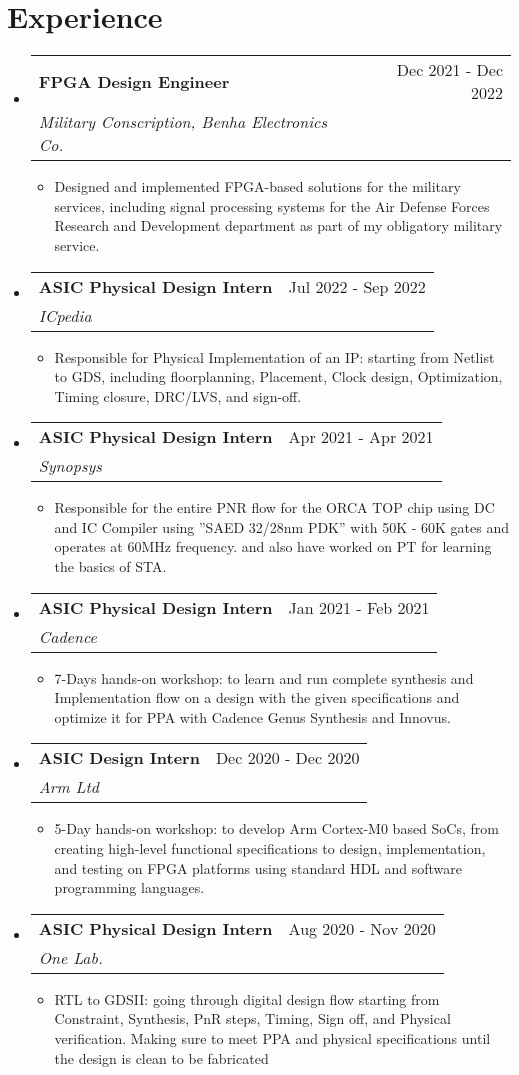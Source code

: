 \documentclass[letterpaper,11pt]{article}
\makeatletter
\newcommand{\sectionStart}{
  \begin{itemize}[label={},leftmargin=0in]
}
\newcommand{\sectionEnd}{
  \end{itemize}
}
\newcommand{\jobHeading}[3]{
  \vspace{-1pt}
  \item
  \begin{tabular*}{1.0\textwidth}{l@{\extracolsep{\fill}}r@{}}
    \normalsize{\textbf{#1}} & #2 \\
    \textit{\small#3} \\
  \end{tabular*}\vspace{-5pt}
}
\newcommand{\listStart}{\begin{itemize}}
\newcommand{\listEnd}{\end{itemize}\vspace{-5pt}}
\newcommand{\bulletItem}[1]{
  \item
  \small{
    {#1 \vspace{-1.8pt}}
  }
}
\makeatother
\begin{document}
\section{Experience}
\sectionStart
\jobHeading
{FPGA Design Engineer}
{Dec 2021 - Dec 2022}
{Military Conscription, Benha Electronics Co.}
\listStart
\bulletItem
{Designed and implemented FPGA-based solutions for the military services, including signal processing systems for the
	Air Defense Forces Research and Development department as part of my obligatory military service.}
\listEnd
\jobHeading
{ASIC Physical Design Intern}
{Jul 2022 - Sep 2022}
{ICpedia}
\listStart
\bulletItem
{Responsible for Physical Implementation of an IP: starting from Netlist to GDS, including floorplanning, Placement, Clock design, Optimization, Timing closure, DRC/LVS, and sign-off.}
\listEnd
\jobHeading
{ASIC Physical Design Intern}
{Apr 2021 - Apr 2021}
{Synopsys}
\listStart
\bulletItem
{Responsible for the entire PNR flow for the ORCA TOP chip using DC and IC Compiler using ”SAED 32/28nm PDK” with 50K
	- 60K gates and operates at 60MHz frequency. and also have worked on PT for learning the basics of STA.}
\listEnd
\jobHeading
{ASIC Physical Design Intern}
{Jan 2021 - Feb 2021}
{Cadence}
\listStart
\bulletItem
{ 7-Days hands-on workshop: to learn and run complete synthesis and Implementation flow on a design with the given
	specifications and optimize it for PPA with Cadence Genus Synthesis and Innovus.}
\listEnd
\jobHeading
{ASIC Design Intern}
{Dec 2020 - Dec 2020}
{Arm Ltd}
\listStart
\bulletItem
{ 5-Day hands-on workshop: to develop Arm Cortex-M0 based SoCs, from creating high-level functional specifications to
	design, implementation, and testing on FPGA platforms using standard HDL and software programming languages.}
\listEnd

\jobHeading
{ASIC Physical Design Intern}
{Aug 2020 - Nov 2020}
{One Lab.}
\listStart
\bulletItem
{RTL to GDSII: going through digital design flow starting from Constraint, Synthesis, PnR steps, Timing, Sign off, and
	Physical verification. Making sure to meet PPA and physical specifications until the design is clean to be fabricated}
\listEnd
\sectionEnd

\end{document}

